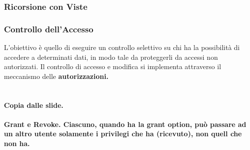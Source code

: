 \documentclass[11pt]{article} %
\begin{document}
\subsubsection{Ricorsione con Viste}
\subsubsection{Controllo dell'Accesso}
L'obiettivo è quello di eseguire un controllo selettivo su chi ha la possibilità di accedere a determinati dati, in modo tale da proteggerli da accessi non autorizzati. Il controllo di accesso e modifica si implementa attraverso il meccanismo delle \bf autorizzazioni\rm.\\\\\\ Copia dalle slide.\\\\ Grant e Revoke. Ciascuno, quando ha la grant option, può passare ad un altro utente solamente i privilegi che ha (ricevuto), non quell che non ha.
\end{document}

